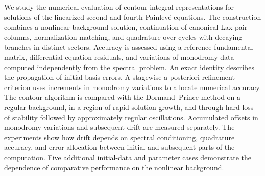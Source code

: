 We study the numerical evaluation of contour integral representations for
solutions of the linearized second and fourth Painlev\'e equations.
The construction combines a nonlinear background solution, continuation of
canonical Lax-pair columns, normalization matching, and quadrature over
cycles with decaying branches in distinct sectors. Accuracy is assessed
using a reference fundamental matrix, differential-equation residuals,
and variations of monodromy data computed independently from the spectral
problem. An exact identity describes the propagation of initial-basis
errors. A stagewise a posteriori refinement criterion uses increments in
monodromy variations to allocate numerical accuracy. The contour algorithm
is compared with the Dormand--Prince method on a regular background, in
a region of rapid solution growth, and through hard loss of stability
followed by approximately regular oscillations. Accumulated offsets in
monodromy variations and subsequent drift are measured separately.
The experiments show how drift depends on spectral conditioning,
quadrature accuracy, and error allocation between initial and subsequent
parts of the computation. Five additional initial-data and parameter
cases demonstrate the dependence of comparative performance on the
nonlinear background.
